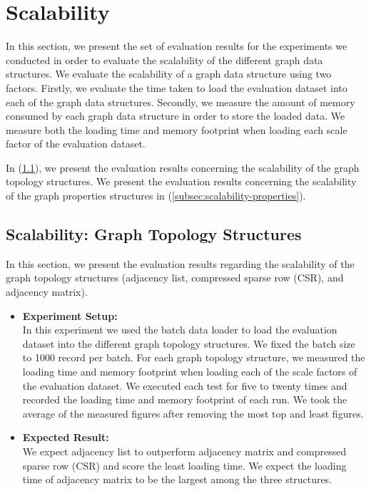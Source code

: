 {\section{Scalability}
\label{sec:eval-scalability}

In this section, we present the set of evaluation results for the experiments we conducted in order to evaluate the scalability of the different graph data structures. We evaluate the scalability of a graph data structure using two factors. Firstly, we evaluate the time taken to load the evaluation dataset into each of the graph data structures. Secondly, we measure the amount of memory consumed by each graph data structure in order to store the loaded data. We measure both the loading time and memory footprint when loading each scale factor of the evaluation dataset.  

In (\ref{subsec:scalability-topology}), we present the evaluation results concerning the scalability of the graph topology structures. We present the evaluation results concerning the scalability of the graph properties structures in (\ref{subsec:scalability-properties}).

\subsection{Scalability: Graph Topology Structures}
\label{subsec:scalability-topology}

In this section, we present the evaluation results regarding the scalability of the graph topology structures (adjacency list, compressed sparse row  (CSR), and adjacency matrix).

\begin{itemize}  

\item \textbf{Experiment Setup:}\\
In this experiment we used the batch data loader to load the evaluation dataset into the different graph topology structures. We fixed the batch size to 1000 record per batch. For each graph topology structure, we measured the loading time and memory footprint when loading each of the scale factors of the evaluation dataset. We executed each test for five to twenty times and recorded the loading time and memory footprint of each run. We took the average of the measured figures after removing the most top and least figures.

\item \textbf{Expected Result:}\\
We expect adjacency list to outperform adjacency matrix and compressed sparse row (CSR) and score the least loading time. We expect the loading time of adjacency matrix to be the largest among the three structures.


\end{itemize}}

